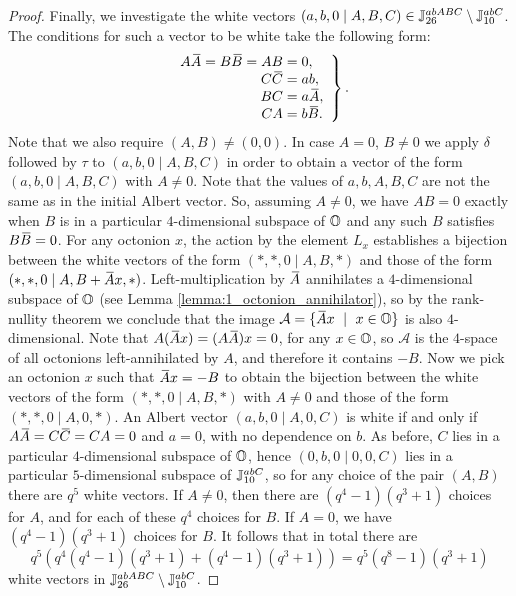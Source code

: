 \begin{proof}
	Finally, we investigate the white vectors $(a,b,0\mid A,B,C) \in 
	 \mathbb{J}_{26}^{abABC}\setminus\mathbb{J}_{10}^{abC}$. The conditions for such a vector 
	 to be white take the following form:
	 \begin{equation}
		\left.\begin{array}{r@{\;}c@{\;}l}
			A \ovA=B\ovB = AB & = & 0, \\
			C \ovC & = & ab, \\
			BC & = & a\ovA, \\
			CA & = & b\ovB.
		\end{array}
		\right\}.
	\end{equation}
	Note that we also require $(A,B) \neq (0,0)$. In case $A = 0$, $B\neq 0$ we apply
	$\delta$ followed by $\tau$ to $(a,b,0\mid A,B,C)$ in order to obtain a 
	vector of the form $(a,b,0\mid A,B,C)$ with $A \neq 0$. Note that the values
	of $a,b,A,B,C$ are not the same as in the initial Albert vector. So, assuming 
	$A \neq 0$, we have $AB = 0$ exactly when $B$ is in a particular $4$-dimensional
	subspace of $\mathbb{O}$ and any such $B$ satisfies $B\mathord{\mbox{\hspace*{0pt}}\,\overline{\!B\!\!\;}\!\:}\mbox{\hspace*{0pt}} = 0$. For any octonion $x$, the
	action by the element $L_x$ establishes a bijection between the white vectors of
	the form $(*,*,0\mid A,B,*)$ and those of the form \mbox{$(*,*,0\mid A,B+\mathord{\mbox{\hspace*{0pt}}\,\overline{\!A\!\!\;}\!\:}\mbox{\hspace*{0pt}} x,*)$}.
	Left-multiplication by $\mathord{\mbox{\hspace*{0pt}}\,\overline{\!A\!\!\;}\!\:}\mbox{\hspace*{0pt}}$ annihilates a $4$-dimensional subspace of $\mathbb{O}$
	(see Lemma \ref{lemma:1_octonion_annihilator}), so by
	the rank-nullity theorem we conclude that the image 
	$\mathcal{A} = \{ \mathord{\mbox{\hspace*{0pt}}\,\overline{\!A\!\!\;}\!\:}\mbox{\hspace*{0pt}} x\ \mid\ x \in \mathbb{O} \}$ is also $4$-dimensional. Note that
	$A (\ovA x) = (A\ovA)x = 0$, for any $x \in \mathbb{O}$, so $\mathcal{A}$ is the $4$-space
	of all octonions left-annihilated by $A$, and therefore it contains $-B$. 
	Now we pick an octonion $x$ such that $\mathord{\mbox{\hspace*{0pt}}\,\overline{\!A\!\!\;}\!\:}\mbox{\hspace*{0pt}} x = -B$ to obtain the bijection between
	the white vectors of the form $(*,*,0\mid A,B,*)$ with $A\neq 0$ and those of the form 
	$(*,*,0\mid A,0,*)$. An Albert vector $(a,b,0\mid A,0,C)$ is white if and only if
	$A\ovA = C\ovC = CA = 0$ and $a = 0$, with no dependence on $b$. As before, $C$ lies in a
	particular $4$-dimensional subspace of $\mathbb{O}$, hence $(0,b,0\mid 0,0,C)$ lies in a
	particular $5$-dimensional subspace of $\mathbb{J}_{10}^{abC}$, so for any choice of the 
	pair $(A,B)$ there are $q^5$ white vectors. If $A \neq 0$, then there are
	$(q^4-1)(q^3+1)$ choices for $A$, and for each of these $q^4$ choices for $B$.
	If $A = 0$, we have $(q^4-1)(q^3+1)$ choices for $B$. It follows that in total there
	are
	\begin{equation*}
		q^5 ( q^4(q^4-1)(q^3+1) + (q^4-1)(q^3+1) ) = q^5(q^8-1)(q^3+1)
	\end{equation*}
	white vectors in $\mathbb{J}_{26}^{abABC}\setminus\mathbb{J}_{10}^{abC}$.
	

\end{proof}
